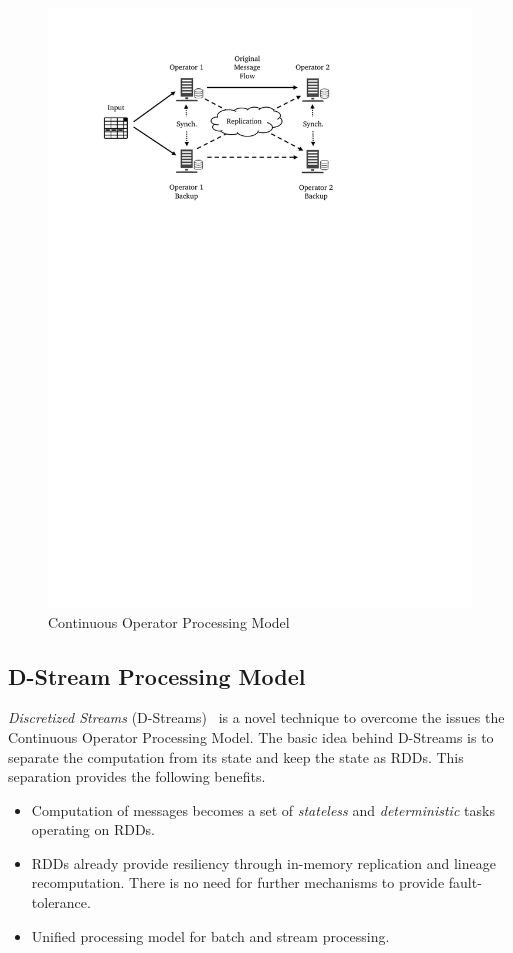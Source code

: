 \begin{figure}[ht]
    \centering
    \includegraphics[clip,trim=2.5cm 20cm 6.7cm 2.2cm]{cont-op.pdf}
    \caption[Continuous Operator Processing Model]{Continuous Operator Processing Model}
    \label{fig:sp:cont-op}
\end{figure}

\subsection{D-Stream Processing Model}
\label{sp:dstream-model}

\emph{Discretized Streams} (D-Streams)~\cite{Zaharia:2013} is a novel technique to overcome the issues the Continuous Operator Processing Model. The basic idea behind D-Streams is to separate the computation from its state and keep the state as RDDs. This separation provides the following benefits.
\begin{itemize}
    \item Computation of messages becomes a set of \emph{stateless} and \emph{deterministic} tasks operating on RDDs.
    \item RDDs already provide resiliency through in-memory replication and lineage recomputation. There is no need for further mechanisms to provide fault-tolerance.
    \item Unified processing model for batch and stream processing.
\end{itemize}

